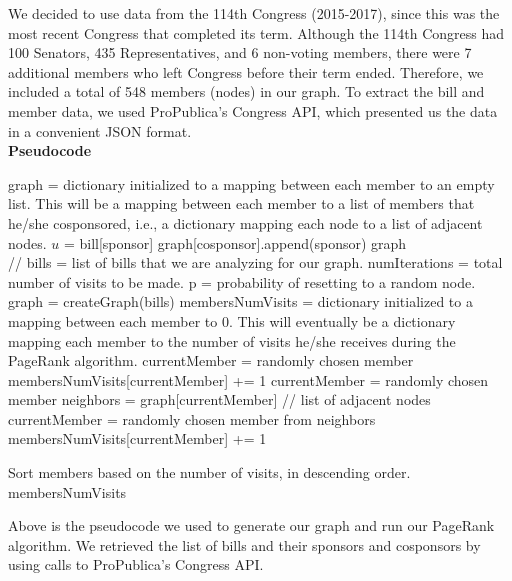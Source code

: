 \documentclass[11pt]{article}
\begin{document}
We decided to use data from the 114th Congress (2015-2017), since this was the most recent Congress that completed its term. Although the 114th Congress had 100 Senators, 435 Representatives, and 6 non-voting members, there were 7 additional members who left Congress before their term ended. Therefore, we included a total of 548 members (nodes) in our graph. To extract the bill and member data, we used ProPublica's Congress API, which presented us the data in a convenient JSON format. \\





\textbf{Pseudocode}

\begin{algorithmic}[1]
\State graph = dictionary initialized to a mapping between each member to an empty list. This will be a mapping between each member to a list of members that he/she cosponsored, i.e., a dictionary mapping each node to a list of adjacent nodes. 
	\State $u$ = bill[sponsor]
		\State graph[cosponsor].append(sponsor)
	\EndFor 
\EndFor
\State \Return graph
\EndProcedure\\


 // bills = list of bills that we are analyzing for our graph. numIterations = total number of visits to be made. p = probability of resetting to a random node. 
\State graph = createGraph(bills) 
\State membersNumVisits = dictionary initialized to a mapping between each member to 0. This will eventually be a dictionary mapping each member to the number of visits he/she receives during the PageRank algorithm. 
\State currentMember = randomly chosen member
\State membersNumVisits[currentMember] += 1
		\State currentMember = randomly chosen member
	\Else
		\State neighbors = graph[currentMember] // list of adjacent nodes
		\State currentMember = randomly chosen member from neighbors
	\EndIf
	\State membersNumVisits[currentMember] += 1

\EndFor
\State Sort members based on the number of visits, in descending order. 
\State \Return membersNumVisits
\EndProcedure
\end{algorithmic}

Above is the pseudocode we used to generate our graph and run our PageRank algorithm. We retrieved the list of bills and their sponsors and cosponsors by using calls to ProPublica's Congress API. 
\end{document}
